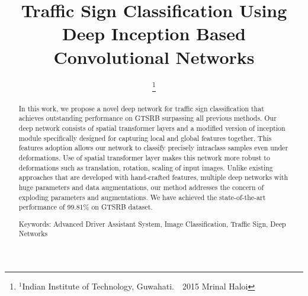 \documentclass[conference]{IEEEtran}
\begin{document}
\title{Traffic Sign Classification Using Deep Inception Based Convolutional Networks}

\author{
\thanks{$ ^1$Indian Institute of Technology, Guwahati.\
\textcopyright~2015 Mrinal Haloi}
}










\maketitle

\begin{abstract}
In this work, we propose a novel deep network for traffic sign classification that achieves outstanding performance on GTSRB surpassing all previous methods. Our deep network consists of spatial transformer layers and a modified version of inception module specifically designed for capturing local and global features together. This features adoption allows our network to classify precisely intraclass samples even under deformations. Use of spatial transformer layer makes this network more robust to deformations such as translation, rotation, scaling of input images. Unlike existing approaches that are developed with hand-crafted features, multiple deep networks with huge parameters and data augmentations, our method addresses the concern of exploding parameters and augmentations. We have achieved the state-of-the-art performance of 99.81\% on GTSRB dataset.   


Keywords: Advanced Driver Assistant System, Image Classification, Traffic Sign, Deep Networks


\end{abstract}





\IEEEpeerreviewmaketitle
\end{document}
